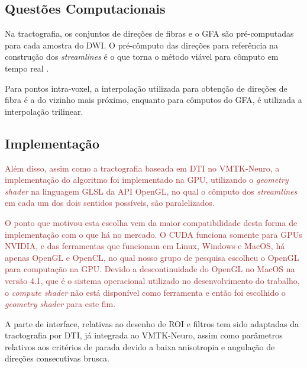 \documentclass[
    12pt,                %
    oneside,            %
    a4paper,            %
    english,            %
    french,                %
    spanish,            %
    brazil                %
    ]{abntex2}
\begin{document}
\subsection{Questões Computacionais}

Na tractografia, os conjuntos de direções de fibras e o GFA são pré-computadas para cada amostra do DWI. O pré-cômputo das direções para referência na construção dos \textit{streamlines} é o que torna o método viável para cômputo em tempo real \cite{Chamberland2016}.%

Para pontos intra-voxel, a interpolação utilizada para obtenção de direções de fibra é a do vizinho mais próximo, enquanto para cômputos do GFA, é utilizada a interpolação trilinear.

\subsection{Implementação}





\textcolor{brown}{
Além disso, assim como a tractografia baseada em DTI no VMTK-Neuro, a implementação do algoritmo foi implementado na GPU, utilizando o \textit{geometry shader} na linguagem GLSL da API OpenGL, no qual o cômputo dos \textit{streamlines} em cada um dos dois sentidos possíveis, são paralelizados.
}

\textcolor{brown}{
O ponto que motivou esta escolha vem da maior compatibilidade desta forma de implementação com o que há no mercado. O CUDA funciona somente para GPUs NVIDIA, e das ferramentas que funcionam em Linux, Windows e MacOS, há apenas OpenGL e OpenCL, no qual nosso grupo de pesquisa escolheu o OpenGL para computação na GPU. Devido a descontinuidade do OpenGL no MacOS na versão 4.1, que é o sistema operacional utilizado no desenvolvimento do trabalho, o \textit{compute shader} não está disponível como ferramenta e então foi escolhido o \textit{geometry shader} para este fim.
}

A parte de interface, relativas ao desenho de ROI e filtros tem sido adaptadas da tractografia por DTI, já integrada ao VMTK-Neuro, assim como parâmetros relativos aos critérios de parada devido a baixa anisotropia e angulação de direções consecutivas brusca.
\end{document}
